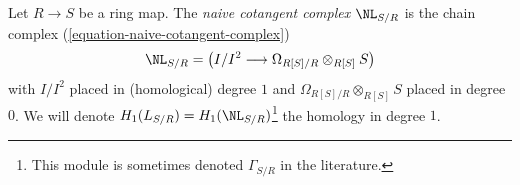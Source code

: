 \begin{definition}
\label{definition-naive-cotangent-complex}
Let $R \to S$ be a ring map. The {\it naive cotangent complex}
$\NL_{S/R}$ is the chain complex (\ref{equation-naive-cotangent-complex})
$$
\NL_{S/R} = \left(I/I^2 \longrightarrow \Omega_{R[S]/R} \otimes_{R[S]} S\right)
$$
with $I/I^2$ placed in (homological) degree $1$ and
$\Omega_{R[S]/R} \otimes_{R[S]} S$ placed in degree $0$. We will denote
$H_1(L_{S/R}) = H_1(\NL_{S/R})$\footnote{This module is sometimes
denoted $\Gamma_{S/R}$ in the literature.} the homology in degree $1$.
\end{definition}